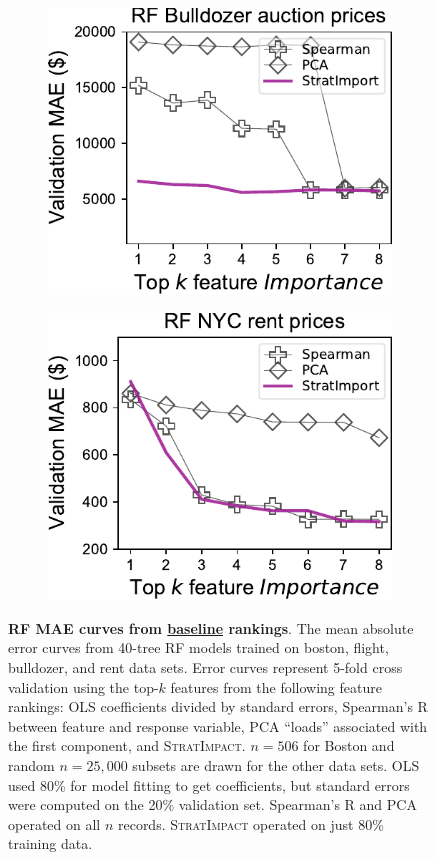 \documentclass[11pt]{article}
\newcommand{\simp}{\fontfamily{cmr}\textsc{\small StratImpact}}
\begin{document}
\begin{figure}
\begin{subfigure}{.245\textwidth}
\subcaption{}
\end{subfigure}
\begin{subfigure}{.245\textwidth}
    \centering
\includegraphics[scale=0.45]{images/bulldozer-topk-RF-baseline.pdf}
\subcaption{}
\end{subfigure}
\begin{subfigure}{.245\textwidth}
    \centering
\includegraphics[scale=0.45]{images/rent-topk-RF-baseline.pdf}
\subcaption{}
\end{subfigure} 
\caption{\small {\bf RF MAE curves from \underline{baseline} rankings}. The mean absolute error curves from 40-tree RF models trained on boston, flight, bulldozer, and rent data sets. Error curves represent 5-fold cross validation using the top-$k$ features from the following feature rankings: OLS coefficients divided by standard errors, Spearman's R between feature and response variable, PCA ``loads'' associated with the first component, and \simp{}. $n=506$ for Boston and random $n=25,000$ subsets are drawn for the other data sets. OLS used 80\% for model fitting to get coefficients, but standard errors were computed on the 20\% validation set.  Spearman's R and PCA operated on all $n$ records. \simp{} operated on just 80\% training data.}

\end{figure}
\end{document}
